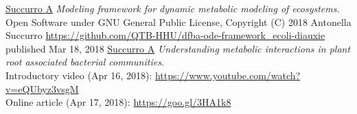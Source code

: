 \renewcommand{\refname}{}

\vspace{-5ex}

\begin{thebibliography}{999}

 \underline{Succurro A} \textit{Modeling framework for dynamic metabolic modeling of ecosystems.} Open Software under GNU General Public License,
  Copyright (C) 2018 Antonella Succurro \url{https://github.com/QTB-HHU/dfba-ode-framework_ecoli-diauxie} published Mar 18, 2018
\vspace{-1ex}  
 \underline{Succurro A} \textit{Understanding metabolic interactions in plant root associated bacterial communities.}\\
  Introductory video (Apr 16, 2018): \url{https://www.youtube.com/watch?v=eQUbyz3vsgM}\\
  Online article (Apr 17, 2018): \url{https://goo.gl/3HA1k8}
\end{thebibliography}

